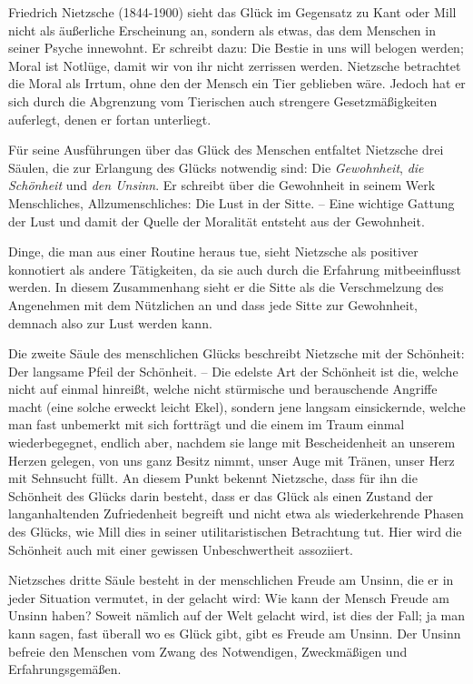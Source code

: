 Friedrich Nietzsche (1844-1900) sieht das Glück im Gegensatz zu Kant oder Mill nicht als äußerliche Erscheinung an, sondern als etwas, das dem Menschen in seiner Psyche innewohnt. 
Er schreibt dazu: \glqq Die Bestie in uns will belogen werden; Moral ist Notlüge, damit wir von ihr nicht zerrissen werden.\grqq{} \cite[S.\,57]{FN06}
Nietzsche betrachtet die Moral als Irrtum, ohne den der Mensch ein Tier geblieben wäre. 
Jedoch hat er sich durch die Abgrenzung vom Tierischen auch strengere Gesetzmäßigkeiten auferlegt, denen er fortan unterliegt.

Für seine Ausführungen über das Glück des Menschen entfaltet Nietzsche drei Säulen, die zur Erlangung des Glücks notwendig sind: Die \textit{Gewohnheit}, \textit{die Schönheit} und \textit{den Unsinn}. 
Er schreibt über die Gewohnheit in seinem Werk \glqq Menschliches, Allzumenschliches\grqq{}: \glqq Die Lust in der Sitte. -- Eine wichtige Gattung der Lust und damit der Quelle der Moralität entsteht aus der Gewohnheit.\grqq{} \cite[S.\,84]{FN06}

Dinge, die man aus einer Routine heraus tue, sieht Nietzsche als positiver konnotiert als andere Tätigkeiten, da sie auch durch die Erfahrung mitbeeinflusst werden. 
In diesem Zusammenhang sieht er die Sitte als die Verschmelzung des Angenehmen mit dem Nützlichen an und dass jede Sitte zur Gewohnheit, demnach also zur Lust werden kann.

Die zweite Säule des menschlichen Glücks beschreibt Nietzsche mit der Schönheit: \glqq Der langsame Pfeil der Schönheit. -- Die edelste Art der Schönheit ist die, welche nicht auf einmal hinreißt, welche nicht stürmische und berauschende Angriffe macht (eine solche erweckt leicht Ekel), sondern jene langsam einsickernde, welche man fast unbemerkt mit sich fortträgt und die einem im Traum einmal wiederbegegnet, endlich aber, nachdem sie lange mit Bescheidenheit an unserem Herzen gelegen, von uns ganz Besitz nimmt, unser Auge mit Tränen, unser Herz mit Sehnsucht füllt.\grqq{} \cite[S.\,131]{FN06}
An diesem Punkt bekennt Nietzsche, dass für ihn die Schönheit des Glücks darin besteht, dass er das Glück als einen Zustand der langanhaltenden Zufriedenheit begreift und nicht etwa als wiederkehrende Phasen des Glücks, wie Mill dies in seiner utilitaristischen Betrachtung tut. 
Hier wird die Schönheit auch mit einer gewissen Unbeschwertheit assoziiert.

Nietzsches dritte Säule besteht in der menschlichen Freude am Unsinn, die er in jeder Situation vermutet, in der gelacht wird: \glqq Wie kann der Mensch Freude am Unsinn haben? Soweit nämlich auf der Welt gelacht wird, ist dies der Fall; ja man kann sagen, fast überall wo es Glück gibt, gibt es Freude am Unsinn.\grqq{} \cite[S.\,159]{FN06}
Der Unsinn befreie den Menschen vom Zwang des \glqq Notwendigen, Zweckmäßigen und Erfahrungsgemäßen\grqq{}.\cite[S.\,159]{FN06}


